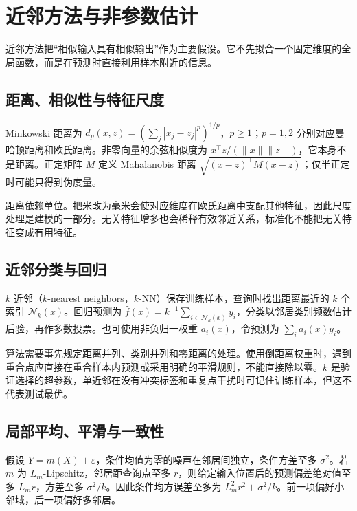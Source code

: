 \setcounter{chapter}{9} %
\chapter{近邻方法与非参数估计}
\label{chap:ml-neighbors}

近邻方法把“相似输入具有相似输出”作为主要假设。它不先拟合一个固定维度的全局函数，而是在预测时直接利用样本附近的信息。

\section{距离、相似性与特征尺度}

Minkowski 距离为 $d_p(x,z)=(\sum_j|x_j-z_j|^p)^{1/p}$，$p\geq1$；$p=1,2$ 分别对应曼哈顿距离和欧氏距离。非零向量的余弦相似度为 $x^\top z/(\|x\|\|z\|)$，它本身不是距离。正定矩阵 $M$ 定义 Mahalanobis 距离 $\sqrt{(x-z)^\top M(x-z)}$；仅半正定时可能只得到伪度量。

距离依赖单位。把米改为毫米会使对应维度在欧氏距离中支配其他特征，因此尺度处理是建模的一部分。无关特征增多也会稀释有效邻近关系，标准化不能把无关特征变成有用特征。

\section{近邻分类与回归}

$k$ 近邻（$k$-nearest neighbors，$k$-NN）保存训练样本，查询时找出距离最近的 $k$ 个索引 $\mathcal N_k(x)$。回归预测为 $\widehat f(x)=k^{-1}\sum_{i\in\mathcal N_k(x)}y_i$，分类以邻居类别频数估计后验，再作多数投票。也可使用非负归一权重 $a_i(x)$，令预测为 $\sum_i a_i(x)y_i$。

算法需要事先规定距离并列、类别并列和零距离的处理。使用倒距离权重时，遇到重合点应直接在重合样本内预测或采用明确的平滑规则，不能直接除以零。$k$ 是验证选择的超参数，单近邻在没有冲突标签和重复点干扰时可记住训练样本，但这不代表测试最优。

\section{局部平均、平滑与一致性}

假设 $Y=m(X)+\varepsilon$，条件均值为零的噪声在邻居间独立，条件方差至多 $\sigma^2$。若 $m$ 为 $L_m$-Lipschitz，邻居距查询点至多 $r$，则给定输入位置后的预测偏差绝对值至多 $L_mr$，方差至多 $\sigma^2/k$。因此条件均方误差至多为 $L_m^2r^2+\sigma^2/k$。前一项偏好小邻域，后一项偏好多邻居。

